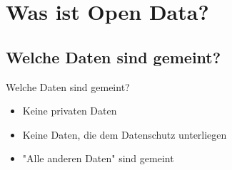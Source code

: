 \section{Was ist Open Data?}

\subsection{Welche Daten sind gemeint?}

\begin{frame}[t]{Welche Daten sind gemeint?}
 \begin{itemize}
  \item Keine privaten Daten
  \item Keine Daten, die dem Datenschutz unterliegen
  \item "Alle anderen Daten" sind gemeint
 \end{itemize}
\end{frame}

